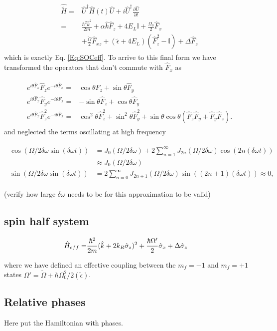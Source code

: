 \begin{align}
	\begin{split}
		\hat{\tilde{H}} = & \hat{U}^{\dagger}\hat{H}(t)\hat{U} + i\hat{U}^{\dagger} \frac{\partial\hat{U}}{\partial t} \\
		 = &\frac{\hbar^2\hat{k}^2}{2m} + \alpha\hat{k}\hat{F}_z +4E_L\mathbb{I} + \frac{\Omega_0}{2}\hat{F}_x \\
		&+ \frac{\tilde{\Omega}}{2}\hat{F}_{xz} +(\tilde{\epsilon}+4E_L)(\hat{F}_z^2-\mathbb{I}) +\Delta\hat{F}_z 	
	\end{split}
\end{align}
%
%
which is exactly Eq. \ref{Eq:SOCeff}. To arrive to this final form we have transformed the operators that don't commute with $\hat{F}_x$ as

%
\begin{align}
	\begin{split}
		e^{i\theta \hat{F}_x} \hat{F}_z e^{-i\theta \hat{F}_x}=& \cos\theta \hat{F}_z + \sin\theta\hat{F}_y \\
		e^{i\theta \hat{F}_x} \hat{F}_y e^{-i\theta \hat{F}_x} =& -\sin\theta\hat{F}_z +\cos\theta\hat{F}_y \\
		e^{i\theta \hat{F}_x} \hat{F}_z^2 e^{-i\theta \hat{F}_x} = &\cos^2\theta\hat{F}_z^2+\sin^2\theta\hat{F}_y^2 + \sin\theta\cos\theta(\hat{F}_z\hat{F}_y + \hat{F}_y\hat{F}_z).
	\end{split}
\end{align}
%
and neglected the terms oscillating at high frequency

\begin{align}
	\begin{split}
	\cos(\Omega/2\delta\omega\sin(\delta\omega t))&= J_0(\Omega/2\delta\omega) + 2\sum_{n=1}^{\infty}J_{2n}(\Omega/2\delta\omega)\cos(2n(\delta\omega t)) \\
	& \approx J_0(\Omega/2\delta\omega) \\
	\sin(\Omega/2\delta\omega\sin(\delta\omega t))&= 2\sum_{n=0}^{\infty}J_{2n+1}(\Omega/2\delta\omega)\sin((2n+1)(\delta\omega t)) \approx 0,
	\end{split}
\end{align} 


(verify how large $\delta\omega$ needs to be for this approximation to be valid)
%
%
 
\subsection{spin half system}
\begin{align}
\begin{split}
\hat{H}_{eff} = & \frac{\hbar^2}{2m}(\hat{k}+2{{k_R}}\hat{\sigma}_z)^2 + \frac{\hbar\Omega'}{2}\hat{\sigma}_x  +\Delta\hat{\sigma}_z  
\label{Eq:SOChalf}
\end{split}
\end{align}	

where we have defined an effective coupling between the $m_f=-1$ and $m_f=+1$ states $\Omega'=\tilde{\Omega}+\hbar\Omega_0^2/2(\tilde{\epsilon})$. 



\subsection{Relative phases}

Here put the Hamiltonian with phases.
